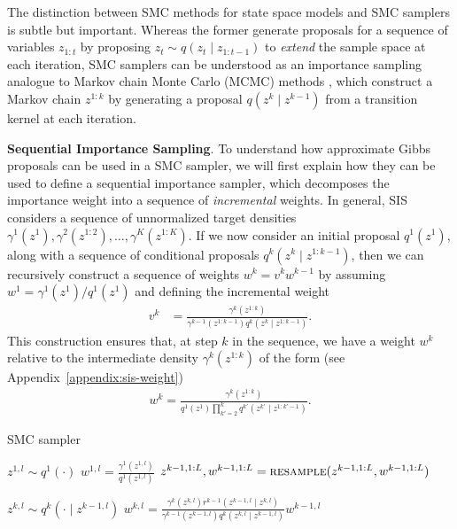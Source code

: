 \documentclass{article}
\theoremstyle{definition}
\begin{document}
The distinction between SMC methods for state space models and SMC samplers is subtle but important. Whereas the former generate proposals for a sequence of variables $z_{1:t}$ by proposing $z_t \sim q(z_t \mid z_{1:t-1})$ to \emph{extend} the sample space at each iteration, SMC samplers can be understood as an importance sampling analogue to Markov chain Monte Carlo (MCMC) methods \cite{brooks2011handbook}, which construct a Markov chain $z^{1:k}$ by generating a proposal $q(z^k \mid z^{k-1})$ from a transition kernel at each iteration.

\textbf{Sequential Importance Sampling}. To understand how approximate Gibbs proposals can be used in a SMC sampler, we will first explain how they can be used to define a sequential importance sampler, which decomposes the importance weight into a sequence of \emph{incremental} weights. In general, SIS considers a sequence of unnormalized target densities $\gamma^1(z^1), \gamma^2(z^{1:2}), \dots, \gamma^K(z^{1:K})$. If we now consider an initial proposal $q^1(z^1)$, along with a sequence of conditional proposals $q^k(z^k \mid z^{1:k-1})$, then we can recursively construct a sequence of weights $w^k = v^k w^{k-1}$ by assuming $w^1 = \gamma^1(z^1) / q^1(z^1)$ and defining the incremental weight
\begin{align*}
    v^k 
    &=
    \frac{\gamma^k(z^{1:k})}{\gamma^{k-1}(z^{1:k-1}) q^k(z^k \mid z^{1:k-1})}.
\end{align*}
This construction ensures that, at step $k$ in the sequence, we have a weight $w^k$ relative to the intermediate  density $\gamma^k(z^{1:k})$ of the form (see Appendix~\ref{appendix:sis-weight})
\begin{align*}
    w^k
    = 
    \frac{\gamma^k(z^{1:k})}
         {q^1(z^1) \prod_{k'=2}^k q^{k'}(z^{k'} \mid z^{1:k'-1})}.
\end{align*}
\begin{algorithm}[!t]
  \caption{SMC sampler}
  \label{alg:smcs}
\begin{algorithmic}[1]
    \small
        \State $z^{1,l} \sim q^1(\cdot)$
        \State $w^{1,l} = \frac{\gamma^1(z^{1,l})}{q^1(z^{1,l})}$
    \EndFor
      \State$z^{k-1,1:L}, w^{k-1,1:L}=\textsc{resample}(z^{k-1,1:L}, w^{k-1,1:L})$

          \State $z^{k,l} \sim q^k(\cdot \mid z^{k-1,l})$\label{line:apg-propose}
          \State $w^{k,l} = \frac{\gamma^k(z^{k,l}) r^{k-1}(z^{k-1,l} \mid z^{k,l})}{\gamma^{k-1}(z^{k-1,l}) q^k(z^{k,l} \mid z^{k-1,l})}w^{k-1,l}$
      \EndFor
    \EndFor
\end{algorithmic}
\end{algorithm}
\end{document}
